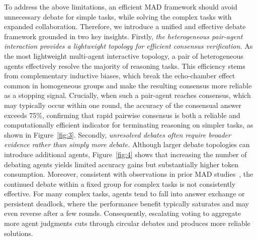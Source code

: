 \documentclass[11pt]{article}
\begin{document}
To address the above limitations, an efficient MAD framework should avoid unnecessary debate for simple tasks, while solving the complex tasks with expanded collaboration.  
Therefore, we introduce a unified and effective debate framework grounded in two key insights.
Firstly, \emph{the heterogeneous pair-agent interaction provides a lightweight topology for efficient consensus verification.}
As the most lightweight multi-agent interactive topology, a pair of heterogeneous agents effectively resolve the majority of reasoning tasks. 
This efficiency stems from complementary inductive biases, which break the echo-chamber effect common in homogeneous groups and make the resulting consensus more reliable as a stopping signal. 
Crucially, when such a pair-agent reaches consensus, which may typically occur within one round, the accuracy of the consensual answer exceeds 75\%, confirming that rapid pairwise consensus is both a reliable and computationally efficient indicator for terminating reasoning on simpler tasks, as shown in Figure~\ref{fig:3}.
Secondly, \emph{unresolved debates often require broader evidence rather than simply more debate.}
Although larger debate topologies can introduce additional agents, Figure~\ref{fig:4} shows that increasing the number of debating agents yields limited accuracy gains but substantially higher token consumption.
Moreover, consistent with observations in prior MAD studies~\cite{wang2024rethinking,zhang2025stop}, the continued debate within a fixed group for complex tasks is not consistently effective.
For many complex tasks, agents tend to fall into answer exchange or persistent deadlock, where the performance benefit typically saturates and may even reverse after a few rounds.
Consequently, escalating voting to aggregate more agent judgments cuts through circular debates and produces more reliable solutions.
\end{document}
